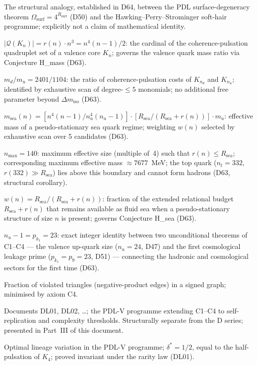 \documentclass[11pt,a4paper]{article}
\theoremstyle{plain}
\theoremstyle{definition}
\theoremstyle{remark}
\newcommand{\Rsurf}{R_{\mathrm{surf}}}
\begin{document}
\begin{description}[leftmargin=3.5cm, style=nextline]
\item[Soft-hair correspondence] The structural analogy, established in D64, between the PDL surface-degeneracy theorem $\Omega_{\mathrm{surf}}=4^{\Rsurf}$ (D50) and the Hawking--Perry--Strominger soft-hair programme; explicitly not a claim of mathematical identity.
\item[Coherence-pulsation cost] $|\mathcal{Q}(K_n)| = r(n)\cdot n^3 = n^4(n-1)/2$: the cardinal of the coherence-pulsation quadruplet set of a valence core $K_n$; governs the valence quark mass ratio via Conjecture H\_mass (D63).
\item[Conjecture H\_mass] $m_d/m_u = 2401/1104$: the ratio of coherence-pulsation costs of $K_{n_d}$ and $K_{n_u}$; identified by exhaustive scan of degree-$\leq 5$ monomials; no additional free parameter beyond $\Delta m_{\mathrm{iso}}$ (D63).
\item[Conjecture H\_sea] $m_{\mathrm{sea}}(n) = [n^4(n-1)/n_u^4(n_u-1)]\cdot[R_{\mathrm{sea}}/(R_{\mathrm{sea}}+r(n))]\cdot m_u$: effective mass of a pseudo-stationary sea quark regime; weighting $w(n)$ selected by exhaustive scan over 5 candidates (D63).
\item[Hadronisation boundary] $n_{\max} = 140$: maximum effective size (multiple of~4) such that $r(n) \leq R_{\mathrm{sea}}$; corresponding maximum effective mass $\approx 7677$~MeV; the top quark ($n_t = 332$, $r(332) \gg R_{\mathrm{sea}}$) lies above this boundary and cannot form hadrons (D63, structural corollary).
\item[Residual fluidity] $w(n) = R_{\mathrm{sea}}/(R_{\mathrm{sea}}+r(n))$: fraction of the extended relational budget $R_{\mathrm{sea}}+r(n)$ that remains available as fluid sea when a pseudo-stationary structure of size $n$ is present; governs Conjecture H\_sea (D63).
\item[Structural identity] $n_u - 1 = p_{k_1} = 23$: exact integer identity between two unconditional theorems of C1--C4 --- the valence up-quark size ($n_u = 24$, D47) and the first cosmological leakage prime ($p_{k_1} = p_9 = 23$, D51) --- connecting the hadronic and cosmological sectors for the first time (D63).
\item[Coherence cost] Fraction of violated triangles (negative-product edges) in a signed graph; minimised by axiom C4.
\item[DL series] Documents DL01, DL02, \ldots; the PDL-V programme extending C1--C4 to self-replication and complexity thresholds. Structurally separate from the D series; presented in Part~III of this document.
\item[$\delta^*$] Optimal lineage variation in the PDL-V programme; $\delta^* = 1/2$, equal to the half-pulsation of $K_4$; proved invariant under the rarity law (DL01).

\end{description}
\end{document}
